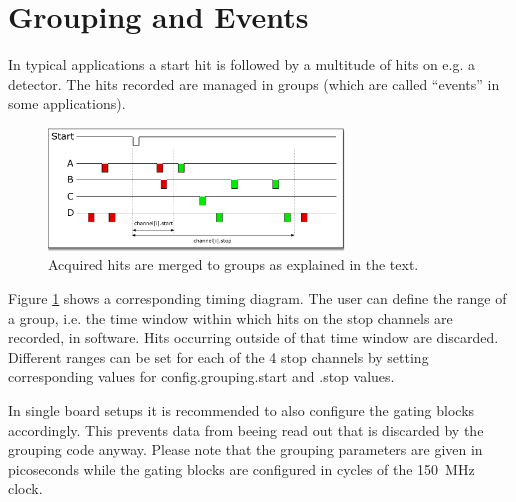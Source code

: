 \section{Grouping and Events}
\label{grouping}

In typical applications a start hit is followed by a multitude of hits on e.g. a detector. 
The hits recorded are managed in groups (which are called ``events'' in some applications). 
%
\begin{figure}[ht]
    \begin{center}
        \includegraphics[width=0.7\textwidth]{figures/grouping.pdf}
        \caption{Acquired hits are merged to groups as explained in the text.\label{fig:grouping}}
    \end{center}
\end{figure}
%

Figure \ref{fig:grouping} shows a corresponding timing diagram. The user can define the range of a group, i.e. the time window within which hits 
on the stop channels are recorded, in software. Hits occurring outside of that time window are discarded. 
 Different ranges can be set for each of the 4 stop channels by setting corresponding values for \textsf{config.grouping.start} and \textsf{.stop} values.


 In single board setups it is recommended to also configure the gating blocks accordingly. 
 This prevents data from beeing read out that is discarded by the grouping code anyway. 
 Please note that the grouping parameters are given in picoseconds while the gating blocks are configured in cycles of the 150~MHz clock.

